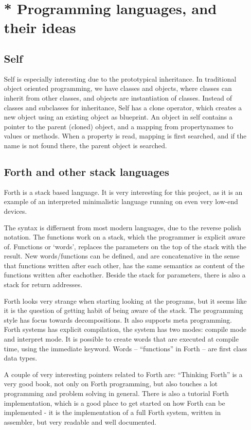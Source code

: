 \section{* Programming languages, and their ideas}
\subsection{Self}
\label{survey-self}
Self\cite{self} is especially interesting due to the prototypical inheritance.
In traditional object oriented programming, we have classes and objects, where classes can inherit from other classes, and objects are instantiation of classes.
Instead of classes and subclasses for inheritance, Self has a clone operator, which creates a new object using an existing object as blueprint.
An object in self contains a pointer to the parent (cloned) object, and a mapping from propertynames to values or methods. When a property is read, mapping is first searched, and if the name is not found there, the parent object is searched.

\subsection{Forth and other stack languages}
Forth is a stack based language.
It is very interesting for this project, as it is an example of an interpreted minimalistic language running on even very low-end devices.

The syntax is differnent from most modern languages, due to the reverse polish notation.
The functions work on a stack, which the programmer is explicit aware of. 
Functions or `words', replaces the parameters on the top of the stack with the result. 
New words/functions can be defined, and are concatenative in the sense that functions written after each other, has the same semantics as content of the functions written after eachother.
Beside the stack for parameters, there is also a stack for return addresses.

Forth looks very strange when starting looking at the programs, but it seems like it is the question of getting habit of being aware of the stack.
The programming style has focus towards decompositions. It also supports meta programming.
Forth systems has explicit compilation, the system has two modes: compile mode and interpret mode. 
It is possible to create words that are executed at compile time, using the immediate keyword.
Words -- ``functions'' in Forth -- are first class data types.

A couple of very interesting pointers related to Forth are: 
``Thinking Forth'' is a very good book, not only on Forth programming, but also touches a lot programming and problem solving in general.
There is also a tutorial Forth implementation\cite{jonesforth}, which is a good place to get started on how Forth can be implemented - it is the implementation of a full Forth system, written in assembler, but very readable and well documented.

